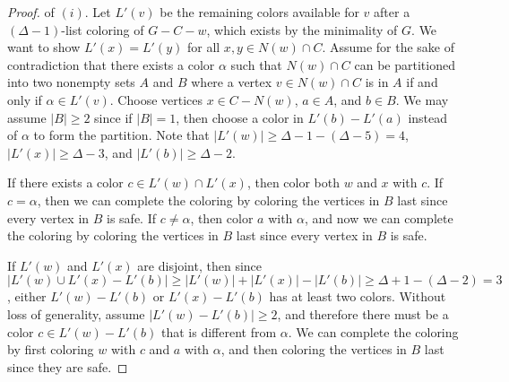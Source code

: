 \documentclass[12pt]{article}
\theoremstyle{definition}
\begin{document}
\begin{proof} of $(i)$.
Let $L'(v)$ be the remaining colors available for $v$ after a $(\Delta-1)$-list coloring of $G-C-w$, which exists by the minimality of $G$. 
We want to show $L'(x)=L'(y)$ for all $x, y\in N(w)\cap C$. 
Assume for the sake of contradiction that there exists a color $\alpha$ such that $N(w)\cap C$ can be partitioned into two nonempty sets $A$ and $B$ where a vertex $v\in N(w)\cap C$ is in $A$ if and only if $\alpha\in L'(v)$. 
Choose vertices $x\in C-N(w)$, $a\in A$, and $b\in B$.
We may assume $|B|\geq 2$ since if $|B|=1$, then choose a color in $L'(b)-L'(a)$ instead of $\alpha$ to form the partition. 
Note that $|L'(w)|\geq \Delta-1-(\Delta-5)=4$, $|L'(x)|\geq \Delta-3$, and $|L'(b)|\geq \Delta-2$. 

If there exists a color $c\in L'(w)\cap L'(x)$, then color both $w$ and $x$ with $c$.
If $c=\alpha$, then we can complete the coloring by coloring the vertices in $B$ last since every vertex in $B$ is safe. 
If $c\neq \alpha$, then color $a$ with $\alpha$, and now we can complete the coloring by coloring the vertices in $B$ last since every vertex in $B$ is safe. 

If $L'(w)$ and $L'(x)$ are disjoint, then since $|L'(w)\cup L'(x)-L'(b)|\geq |L'(w)|+|L'(x)|-|L'(b)|\geq \Delta+1-(\Delta-2)=3$, either $L'(w)-L'(b)$ or $L'(x)-L'(b)$ has at least two colors. 
Without loss of generality, assume $|L'(w)-L'(b)|\geq 2$, and therefore there must be a color $c\in L'(w)-L'(b)$ that is different from $\alpha$. 
We can complete the coloring by first coloring $w$ with $c$ and $a$ with $\alpha$, and then coloring the vertices in $B$ last since they are safe. 
\end{proof}
\end{document}
